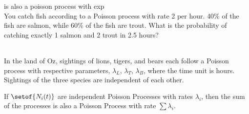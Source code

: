 \documentclass[answers,12pt,addpoints]{exam}
\begin{document}
\begin{questions}
\begin{solution}
    \end{solution}
     is also a poisson process with exp
     \\
    You catch fish according to a Poisson process with rate 2 per hour. 40\% of the fish are salmon, while 60\%
    of the fish are trout. What is the probability of catching exactly 1 salmon and 2 trout in 2.5 hours?\\
    \begin{solution}
        
    \end{solution}

    
    \\
    In the land of Oz, sightings of lions, tigers, and bears each follow a Poisson process with respective
    parameters, $\lambda_L$, $\lambda_T$, $\lambda_B$, where the time unit is hours. Sightings of the three species are independent of
    each other.
    \begin{solution}
        If $\setof{N_i(t)}$ are independent Poisson Processes with rates $\lambda_i$, then the sum of the processes is also a Poisson Process with rate $\sum \lambda_i$.\\
    \end{solution}





    
\end{questions}
\end{document}
